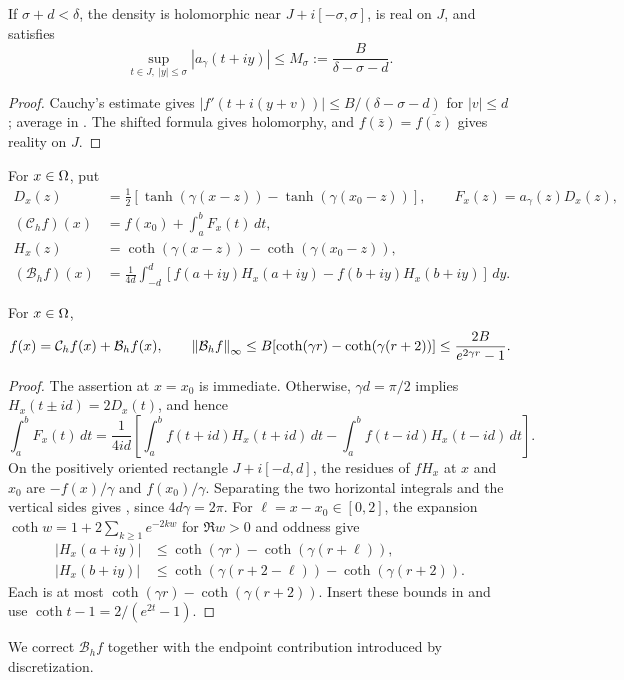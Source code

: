 \begin{lemma}
\label{lem:density}
If $\sigma+d<\delta$, the density is holomorphic near
$J+i[-\sigma,\sigma]$, is real on $J$, and satisfies
\begin{equation}
 \sup_{t\in J,\ |y|\le\sigma}|a_\gamma(t+iy)|
 \le M_\sigma:=\frac B{\delta-\sigma-d}.
 \label{eq:density-bound}
\end{equation}
\end{lemma}
\begin{proof}
Cauchy's estimate gives $|f'(t+i(y+v))|\le B/(\delta-\sigma-d)$ for
$|v|\le d$; average in . The shifted formula gives
holomorphy, and $f(\bar z)=\overline{f(z)}$ gives reality on $J$.
\end{proof}
For $x\in\Omega$, put
\begin{align}
 D_x(z)&=\tfrac12[\tanh(\gamma(x-z))-\tanh(\gamma(x_0-z))],
 \qquad F_x(z)=a_\gamma(z)D_x(z), \label{eq:D-F}\\
 (\mathcal C_h f)(x)&=f(x_0)+\int_a^bF_x(t)\,dt, \label{eq:Ch}\\
 H_x(z)&=\coth(\gamma(x-z))-\coth(\gamma(x_0-z)), \label{eq:Hx}\\
 (\mathcal B_hf)(x)&=\frac1{4d}\int_{-d}^d
 [f(a+iy)H_x(a+iy)-f(b+iy)H_x(b+iy)]\,dy. \label{eq:Bh}
\end{align}

\begin{lemma}
\label{lem:finite-rep}
For $x\in\Omega$,
\begin{equation}
 f(x)=\mathcal C_hf(x)+\mathcal B_hf(x),\qquad
 \left\lVert \mathcal B_hf\right\rVert_\infty
 \le B[\coth(\gamma r)-\coth(\gamma(r+2))]
 \le\frac{2B}{e^{2\gamma r}-1}.
 \label{eq:finite-rep}
\end{equation}
\end{lemma}
\begin{proof}
The assertion at $x=x_0$ is immediate. Otherwise, $\gamma d=\pi/2$ implies
$H_x(t\pm id)=2D_x(t)$, and hence
\[
 \int_a^bF_x(t)\,dt=\frac1{4id}\left[
 \int_a^b f(t+id)H_x(t+id)\,dt-
 \int_a^b f(t-id)H_x(t-id)\,dt\right].
\]
On the positively oriented rectangle $J+i[-d,d]$, the residues of $fH_x$
at $x$ and $x_0$ are $-f(x)/\gamma$ and $f(x_0)/\gamma$.
Separating the two horizontal integrals and the vertical sides gives
, since $4d\gamma=2\pi$.
For $\ell=x-x_0\in[0,2]$, the expansion
$\coth w=1+2\sum_{k\ge1}e^{-2kw}$ for $\Re w>0$ and oddness give
\begin{align*}
 |H_x(a+iy)|&\le\coth(\gamma r)-\coth(\gamma(r+\ell)),\\
 |H_x(b+iy)|&\le\coth(\gamma(r+2-\ell))-\coth(\gamma(r+2)).
\end{align*}
Each is at most $\coth(\gamma r)-\coth(\gamma(r+2))$.
Insert these bounds in  and use
$\coth t-1=2/(e^{2t}-1)$.
\end{proof}
We correct $\mathcal B_h f$ together with the endpoint contribution
introduced by discretization.

